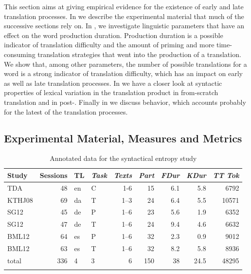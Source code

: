 \documentclass[output=paper]{LSP/langsci}
\begin{document}
This section aims at giving empirical evidence for the existence of early and late translation processes. In  we describe the experimental material that much of the successive sections rely on.  
In , we investigate linguistic parameters that have an effect on the word production duration. Production duration is a possible indicator of translation difficulty and the amount of priming and more time-consuming translation strategies that went into the production of a translation. We show that, among other parameters, the number of possible translations for a word is a strong indicator of translation difficulty, which has an impact on early as well as late translation processes. In  we have a closer look at syntactic properties of lexical variation in the translation product in from-scratch translation and in post-. Finally in  we discuss  behavior, which accounts probably for the latest of the translation processes.


\subsection{Experimental Material, Measures and Metrics}
\label{carl-schaeffer:sec:4.1}

\begin{table}
\begin{center}
\begin{tabular}{lrllrrrrr}
\lsptoprule
Study	&	Sessions&TL&\textit{Task}&\textit{Texts}&\textit{Part}&\textit{FDur}	&\textit{KDur}&\textit{TT Tok}	\\ \midrule
TDA		&	48	&	en	&	C	&	1-6	&	15	&	6.1	&	5.8	&	6792	\\
\tablevspace
KTHJ08	&	69	&	da	&	T	&	1--3	&	24	&	6.4	&	5.5	&	10571	\\
\tablevspace
SG12	&	45	&	de	&	P	&	1--6	&	23	&	5.6	&	1.9	&	6352	\\
\tablevspace
SG12	&	47	&	de	&	T	&	1--6	&	24	&	9.4	&	4.6	&	6632	\\
\tablevspace
BML12	&	64	&	es	&	P	&	1--6	&	32	&	2.3	&	0.9	&	9012	\\
\tablevspace
BML12	&	63	&	es	&	T	&	1--6	&	32	&	8.2	&	5.8	&	8936	\\ 
\midrule
total	&	336	&	4	&	3	&	6	&	150	&	38	&	24.5&	48295	\\
\lspbottomrule
\end{tabular}
\end{center}
\caption{Annotated data for the syntactical entropy study}
\label{carl-schaeffer:tab:tprmultilingdata}
\end{table}
\end{document}
